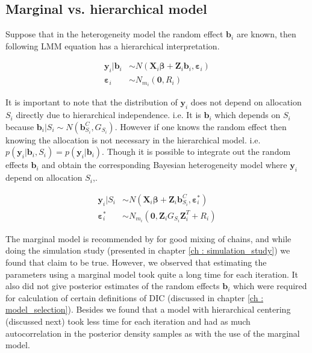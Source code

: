 \subsection{Marginal vs. hierarchical model}
Suppose that in the heterogeneity model the random effect $\boldsymbol{b}_i$ are known, then following LMM equation has a hierarchical interpretation.

\begin{equation}
\begin{split}
\boldsymbol{y}_i|\boldsymbol{b}_{i} &\sim N(\boldsymbol{X}_{i}\boldsymbol{\beta} + \boldsymbol{Z}_{i}\boldsymbol{b}_{i},\boldsymbol{\varepsilon}_{i})\\ 
\boldsymbol{\varepsilon}_{i} &\sim N_{m_i}(\boldsymbol{0}, R_i)
\end{split}
\end{equation}

It is important to note that the distribution of $\boldsymbol{y}_i$ does not depend on allocation $S_i$ directly due to hierarchical independence. i.e. It is $\boldsymbol{b}_{i}$ which depends on $S_i$ because $\boldsymbol{b}_{i}|S_i \sim N(\boldsymbol{b}_{S_i}^C, G_{S_i})$. However if one knows the random effect then knowing the allocation is not necessary in the hierarchical model. i.e. $p(\boldsymbol{y}_i|\boldsymbol{b}_{i}, S_i) = p(\boldsymbol{y}_i|\boldsymbol{b}_{i})$. Though it is possible to integrate out the random effects $\boldsymbol{b}_{i}$ and obtain the corresponding Bayesian heterogeneity model where $\boldsymbol{y}_i$ depend on allocation $S_i$,.

\begin{equation}
\begin{split}
\boldsymbol{y}_i|S_i &\sim N(\boldsymbol{X}_{i}\boldsymbol{\beta} + \boldsymbol{Z}_{i}\boldsymbol{b}_{S_i}^C, \boldsymbol{\varepsilon}_{i}^*)\\ 
\boldsymbol{\varepsilon}_{i}^* &\sim N_{m_i}(\boldsymbol{0}, \boldsymbol{Z}_{i}G_{S_i}\boldsymbol{Z}_{i}^T+ R_i)
\end{split}
\end{equation}

The marginal model is recommended by \citet{fruhwirth-schnatter_bayesian_2004} for good mixing of chains, and while doing the simulation study (presented in chapter \ref{ch : simulation_study}) we found that claim to be true. However, we observed that estimating the parameters using a marginal model took quite a long time for each iteration. It also did not give posterior estimates of the random effects $\boldsymbol{b}_i$ which were required for calculation of certain definitions of DIC (discussed in chapter \ref{ch : model_selection}). Besides we found that a model with hierarchical centering (discussed next) took less time for each iteration and had as much autocorrelation in the posterior density samples as with the use of the marginal model.

